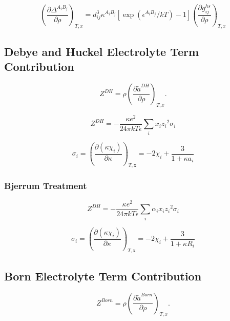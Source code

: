 \documentclass[12pt, letterpaper]{article}
\begin{document}
\begin{equation}
\left(\frac{\partial\Delta^{A_iB_j}}{\partial\rho}\right)_{T,x}=d_{ij}^3\kappa^{A_iB_j}\left[\exp(\epsilon^{A_iB_j}/kT)-1\right]\left(\frac{\partial g_{ij}^{hs}}{\partial\rho}\right)_{T,x}
\end{equation}


\subsection{Debye and Huckel Electrolyte Term Contribution}

\cite{Bulow2019}

\begin{equation}
Z^{DH} =\rho\left(\frac{\partial\tilde{a}^{DH}}{\partial\rho}\right)_{T,x}
.\end{equation}

\begin{equation}
Z^{DH}=-\frac{\kappa e^2}{24\pi kT\epsilon}\sum_{i}x_{i}z_{i}{}^{2}\sigma_{i}
\end{equation}

\begin{equation}
\sigma_i=\left(\frac{\partial(\kappa\chi_i)}{\partial\kappa}\right)_{T,\mathrm{x}}=-2\chi_i+\frac{3}{1+\kappa a_i}
\end{equation}

\subsubsection{Bjerrum Treatment}

\cite{Bulow2021}

\begin{equation}
Z^{DH}=-\frac{\kappa e^2}{24\pi kT\epsilon}\sum_{i}\alpha _ix_{i}z_{i}{}^{2}\sigma_{i}
\end{equation}

\begin{equation}
\sigma_i=\left(\frac{\partial(\kappa\chi_i)}{\partial\kappa}\right)_{T,\mathrm{x}}=-2\chi_i+\frac{3}{1+\kappa R_i}
\end{equation}

\subsection{Born Electrolyte Term Contribution}

\begin{equation}
Z^{Born} =\rho\left(\frac{\partial\tilde{a}^{Born}}{\partial\rho}\right)_{T,x}
.\end{equation}
\end{document}
